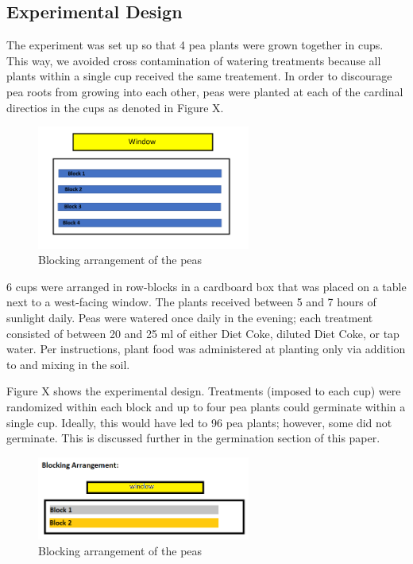 \documentclass[1p,12pt]{elsarticle}\usepackage[]{graphicx}\usepackage[]{color}
\begin{document}
\subsection{Experimental Design}

The experiment was set up so that 4 pea plants were grown together in cups. This way, we avoided cross contamination of watering treatments because all plants within a single cup received the same treatement.  In order to discourage pea roots from growing into each other, peas were planted at each of the cardinal directios in the cups as denoted in Figure X. 
 \begin{figure}[h!]
 	\caption{Blocking arrangement of the peas}
 	\centering
	\includegraphics[width = 7cm]{blocks.png}
\end{figure}


6 cups were arranged in row-blocks in a cardboard box that was placed on a table next to a west-facing window. The plants received between 5 and 7 hours of sunlight daily.  Peas were watered once daily in the evening; each treatment consisted of between 20 and 25 ml of either Diet Coke, diluted Diet Coke, or tap water. Per instructions, plant food was administered at planting only via addition to and mixing in the soil.  

Figure X shows the experimental design. Treatments (imposed to each cup) were randomized within each block and up to four pea plants could germinate within a single cup. Ideally, this would have led to 96 pea plants; however, some did not germinate. This is discussed further in the germination section of this paper. 

 \begin{figure}[h!]
 	\caption{Blocking arrangement of the peas}
 	\centering
	\includegraphics[width = 7cm]{figure/blocking_arrangment.png}
\end{figure}
\end{document}
